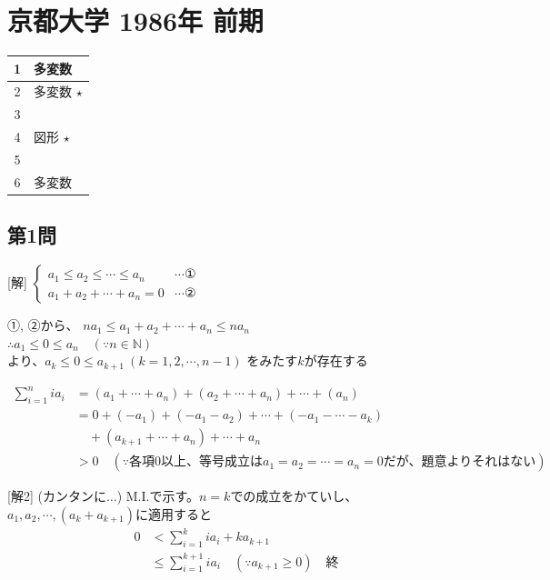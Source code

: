 \documentclass[../main.tex]{subfiles}
\begin{document}
\section*{京都大学 1986年 前期}
\begin{center}
  \begin{tabular}{|c|l|}
    \hline
    1 & 多変数 \\
    \hline
    2 & 多変数 \quad $\star$ \\
    \hline
    3 & \\
    \hline
    4 & 図形 \quad $\star$ \\
    \hline
    5 & \\
    \hline
    6 & 多変数 \\
    \hline
  \end{tabular}
\end{center}

\subsection*{第1問}
[解]
$
\begin{cases}
  a_1 \le a_2 \le \cdots \le a_n & \cdots \text{①} \\
  a_1 + a_2 + \cdots + a_n = 0 & \cdots \text{②}
\end{cases}$

①, ②から、
$n a_1 \le a_1 + a_2 + \cdots + a_n \le n a_n$ \\
$\therefore a_1 \le 0 \le a_n \quad (\because n \in \mathbb{N})$ \\
より、$a_k \le 0 \le a_{k+1} \ (k=1, 2, \cdots, n-1)$ をみたす$k$が存在する

\begin{align*}
  \sum_{i=1}^{n} i a_i &= (a_1 + \cdots + a_n) + (a_2 + \cdots + a_n) + \cdots + (a_n) \\
  &= 0 + (-a_1) + (-a_1 - a_2) + \cdots + (-a_1 - \cdots - a_k) \\
  &\quad + (a_{k+1} + \cdots + a_n) + \cdots + a_n \\
  &> 0 \quad (\because \text{各項0以上、等号成立は} a_1 = a_2 = \cdots = a_n = 0 \text{だが、題意よりそれはない})
\end{align*}

[解2] (カンタンに$\dots$)
M.I.で示す。$n=k$での成立をかていし、$a_1, a_2, \cdots, (a_k + a_{k+1})$に適用すると
\begin{align*}
  0 &< \sum_{i=1}^{k} i a_i + k a_{k+1} \\
  &\le \sum_{i=1}^{k+1} i a_i \quad (\because a_{k+1} \ge 0) \quad \text{終}
\end{align*}
\end{document}
